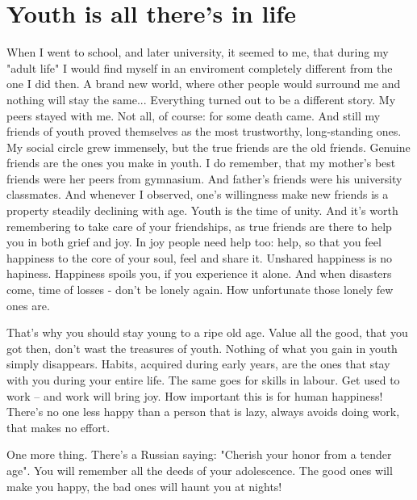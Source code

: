 \chapter{Youth is all there's in life}

When I went to school, and later university, it seemed to me, that during my "adult life" I would find myself in an enviroment completely different from the one I did then. A brand new world, where other people would surround me and nothing will stay the same... Everything turned out to be a different story. My peers stayed with me. Not all, of course: for some death came. And still my friends of youth proved themselves as the most trustworthy, long-standing ones. My social circle grew immensely, but the true friends are the old friends. Genuine friends are the ones you make in youth. I do remember, that my mother's best friends were her peers from gymnasium. And father's friends were his university classmates. And whenever I observed, one's willingness make new friends is a property steadily declining with age. Youth is the time of unity. And it's worth remembering to take care of your friendships, as true friends are there to help you in both grief and joy. In joy people need help too: help, so that you feel happiness to the core of your soul, feel and share it. Unshared happiness is no hapiness. Happiness spoils you, if you experience it alone. And when disasters come, time of losses - don't be lonely again. How unfortunate those lonely few ones are.

That's why you should stay young to a ripe old age. Value all the good, that you got then, don't wast the treasures of youth. Nothing of what you gain in youth simply disappears. Habits, acquired during early years, are the ones that stay with you during your entire life. The same goes for skills in labour. Get used to work -- and work will bring joy. How important this is for human happiness! There's no one less happy than a person that is lazy, always avoids doing work, that makes no effort.

One more thing. There's a Russian saying: "Cherish your honor from a tender age". You will remember all the deeds of your adolescence. The good ones will make you happy, the bad ones will haunt you at nights!
